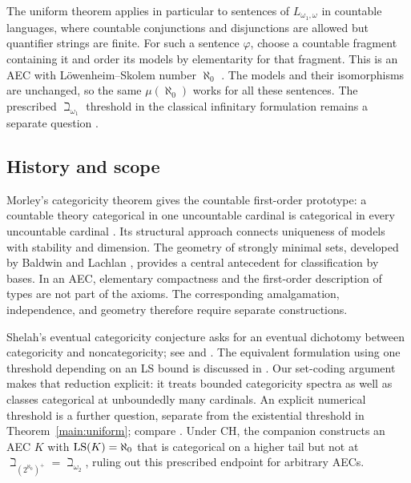 The uniform theorem applies in particular to sentences of
$L_{\omega_1,\omega}$ in countable languages, where countable conjunctions
and disjunctions are allowed but quantifier strings are finite.
For such a sentence $\varphi$, choose a countable fragment containing it
and order its models by elementarity for that fragment. This is an AEC
with L\"owenheim--Skolem number $\aleph_0$
\cite[Example~2.0.2]{BoneyVasey2017Survey}. The models and their
isomorphisms are unchanged, so the same $\mu(\aleph_0)$ works for all
these sentences. The prescribed $\beth_{\omega_1}$ threshold in the
classical infinitary formulation remains a separate question
\cite[Conjecture~1.1]{BoneyVasey2015}.

\subsection{History and scope}

Morley's categoricity theorem gives the countable first-order prototype:
a countable theory categorical in one uncountable cardinal is categorical
in every uncountable cardinal \cite{Morley1965}.  Its structural approach
connects uniqueness of models with stability and dimension.  The geometry
of strongly minimal sets, developed by Baldwin and Lachlan
\cite[Sections~1--2]{BaldwinLachlan1971}, provides a central antecedent for
classification by bases.  In an AEC, elementary compactness and the
first-order description of types are not part of the axioms.  The
corresponding amalgamation, independence, and geometry therefore require
separate constructions.

Shelah's eventual categoricity conjecture asks for an eventual dichotomy
between categoricity and noncategoricity; see
\cite[Conjecture~N.4.2]{Shelah2009} and \cite{BoneyVasey2015}.
The equivalent formulation using one threshold depending on an LS bound
is discussed in \cite[Remark~1.3]{VaseyUniversalI}.  Our set-coding
argument makes that reduction explicit: it treats bounded categoricity
spectra as well as classes categorical at unboundedly many cardinals.
An explicit numerical threshold is a further question, separate from the
existential threshold in Theorem~\ref{main:uniform}; compare
\cite[Conjecture~N.4.3(1)(b)]{Shelah2009}.
Under CH, the companion \cite[Theorem~1.1]{OpenAI2026CHThreshold}
constructs an AEC $K$ with $\operatorname{LS}(K)=\aleph_0$ that is categorical on a
higher tail but not at $\beth_{(2^{\aleph_0})^+}=\beth_{\omega_2}$,
ruling out this prescribed endpoint for arbitrary AECs.

